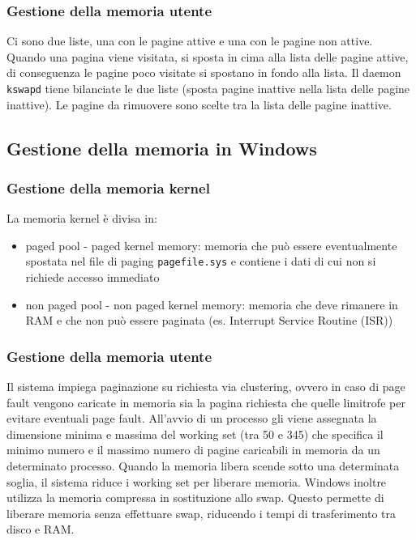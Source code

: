 \documentclass[a4paper]{article}
\begin{document}
\subsubsection*{Gestione della memoria utente}
Ci sono due liste, una con le pagine attive e una con le pagine non attive. Quando una pagina viene visitata, si sposta in cima
alla lista delle pagine attive, di conseguenza le pagine poco visitate si spostano in fondo alla lista. Il daemon \verb|kswapd|
tiene bilanciate le due liste (sposta pagine inattive nella lista delle pagine inattive). Le pagine da rimuovere sono scelte tra
la lista delle pagine inattive.


\subsection{Gestione della memoria in Windows}
\subsubsection*{Gestione della memoria kernel}
La memoria kernel è divisa in:
\begin{itemize}
	\item paged pool - paged kernel memory: memoria che può essere eventualmente spostata nel file di paging \verb|pagefile.sys|
	e contiene i dati di cui non si richiede accesso immediato
	\item non paged pool - non paged kernel memory: memoria che deve rimanere in RAM e che non può essere paginata (es. Interrupt
	Service Routine (ISR))
\end{itemize}

\subsubsection*{Gestione della memoria utente}
Il sistema impiega paginazione su richiesta via clustering, ovvero in caso di page fault vengono caricate in memoria sia la
pagina richiesta che quelle limitrofe per evitare eventuali page fault. All'avvio di un processo gli viene assegnata la
dimensione minima e massima del working set (tra 50 e 345) che specifica il minimo numero e il massimo numero di pagine
caricabili in memoria da un determinato processo. Quando la memoria libera scende sotto una determinata soglia, il sistema
riduce i working set per liberare memoria. Windows inoltre utilizza la memoria compressa in sostituzione allo swap. Questo
permette di liberare memoria senza effettuare swap, riducendo i tempi di trasferimento tra disco e RAM.
\end{document}
